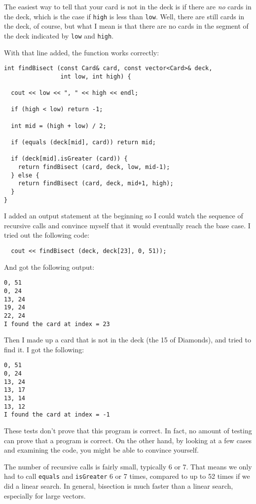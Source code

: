 
The easiest way to tell that your card is not in the deck
is if there are {\em no} cards in the deck, which is the
case if {\tt high} is less than {\tt low}.  Well, there are
still cards in the deck, of course, but what I mean is that
there are no cards in the segment of the deck indicated by
{\tt low} and {\tt high}.

With that line added, the function works correctly:

\begin{verbatim}
int findBisect (const Card& card, const vector<Card>& deck,
                int low, int high) {

  cout << low << ", " << high << endl;

  if (high < low) return -1;

  int mid = (high + low) / 2;

  if (equals (deck[mid], card)) return mid;

  if (deck[mid].isGreater (card)) {
    return findBisect (card, deck, low, mid-1);
  } else {
    return findBisect (card, deck, mid+1, high);
  }
}
\end{verbatim}
%
I added an output statement at the beginning so I could watch
the sequence of recursive calls and convince myself
that it would eventually reach the base case.  I tried out the
following code:

\begin{verbatim}
  cout << findBisect (deck, deck[23], 0, 51));
\end{verbatim}
%
And got the following output:

\begin{verbatim}
0, 51
0, 24
13, 24
19, 24
22, 24
I found the card at index = 23
\end{verbatim}
%
Then I made up a card that is not in the deck (the 15 of Diamonds),
and tried to find it.  I got the following:

\begin{verbatim}
0, 51
0, 24
13, 24
13, 17
13, 14
13, 12
I found the card at index = -1
\end{verbatim}
%
These tests don't prove that this program is correct.  In fact, no
amount of testing can prove that a program is correct.  On the other
hand, by looking at a few cases and examining the code, you might be
able to convince yourself.


The number of recursive calls is fairly small, typically 6 or 7.  That
means we only had to call {\tt equals} and {\tt isGreater} 6 or 7
times, compared to up to 52 times if we did a linear search.  In
general, bisection is much faster than a linear search, especially for
large vectors.

